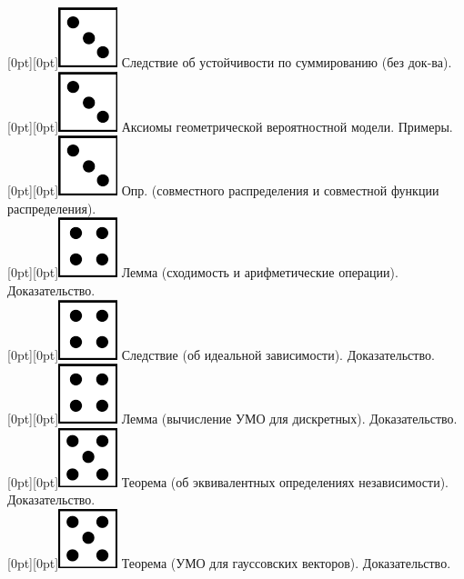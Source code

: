 \documentclass[10pt]{article}
\begin{document}
\raisebox{-1pt}[0pt][0pt]{\includegraphics[width=0.02\linewidth]{3.png}} Следствие об устойчивости по суммированию (без док-ва). \\

\raisebox{-1pt}[0pt][0pt]{\includegraphics[width=0.02\linewidth]{3.png}} Аксиомы геометрической вероятностной модели. Примеры. \\

\raisebox{-1pt}[0pt][0pt]{\includegraphics[width=0.02\linewidth]{3.png}} Опр. (совместного распределения и  совместной функции распределения). \\

\raisebox{-1pt}[0pt][0pt]{\includegraphics[width=0.02\linewidth]{4.png}} Лемма (сходимость и арифметические операции). Доказательство. \\

\raisebox{-1pt}[0pt][0pt]{\includegraphics[width=0.02\linewidth]{4.png}} Следствие (об идеальной зависимости). Доказательство. \\

\raisebox{-1pt}[0pt][0pt]{\includegraphics[width=0.02\linewidth]{4.png}} Лемма (вычисление УМО для дискретных). Доказательство. \\

\raisebox{-1pt}[0pt][0pt]{\includegraphics[width=0.02\linewidth]{5.png}} Теорема (об эквивалентных определениях независимости). Доказательство. \\

\raisebox{-1pt}[0pt][0pt]{\includegraphics[width=0.02\linewidth]{5.png}} Теорема (УМО для гауссовских векторов). Доказательство. \\
\end{document}
